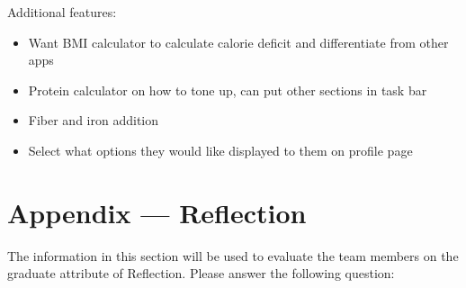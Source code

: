 \documentclass[12pt, titlepage]{article}
\begin{document}
	Additional features:
	\begin{itemize}
		\item Want BMI calculator to calculate calorie deficit and differentiate from other apps
		\item Protein calculator on how to tone up, can put other sections in task bar
		\item Fiber and iron addition
		\item Select what options they would like displayed to them on profile page
	\end{itemize}
	
	
	
	
	\newpage{}
	\section*{Appendix --- Reflection}
	
	The information in this section will be used to evaluate the team members 
	on the
	graduate attribute of Reflection.  Please answer the following question:
	
\end{document}
